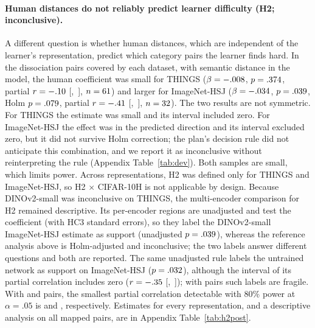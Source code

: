 \documentclass[11pt]{article}
\begin{document}
\paragraph{Human distances do not reliably predict learner difficulty (H2; inconclusive).} A different question is whether human distances, which are independent of the learner's representation, predict which category pairs the learner finds hard. In the dissociation pairs covered by each dataset, with semantic distance in the model, the human coefficient was small for THINGS ($\beta = -.008$, $p = .374$, partial $r = -.10$ [\HTwoThingsRLo,~\HTwoThingsRHi], $n = 61$) and larger for ImageNet-HSJ ($\beta = -.034$, $p = .039$, Holm $p = .079$, partial $r = -.41$ [\HTwoHsjRLo,~\HTwoHsjRHi], $n = 32$). The two results are not symmetric. For THINGS the estimate was small and its interval included zero. For ImageNet-HSJ the effect was in the predicted direction and its interval excluded zero, but it did not survive Holm correction; the plan's decision rule did not anticipate this combination, and we report it as inconclusive without reinterpreting the rule (Appendix Table~\ref{tab:dev}). Both samples are small, which limits power. Across representations, H2 was defined only for THINGS and ImageNet-HSJ, so H2 $\times$ CIFAR-10H is not applicable by design. Because DINOv2-small was inconclusive on THINGS, the multi-encoder comparison for H2 remained descriptive. Its per-encoder regions are unadjusted and test the coefficient (with HC3 standard errors), so they label the DINOv2-small ImageNet-HSJ estimate as support (unadjusted $p = .039$), whereas the reference analysis above is Holm-adjusted and inconclusive; the two labels answer different questions and both are reported. The same unadjusted rule labels the untrained network as support on ImageNet-HSJ ($p = .032$), although the interval of its partial correlation includes zero ($r = -.35$ [\VcHtwoRandHsjLo,~\VcHtwoRandHsjHi]); with \HTwoHsjN{} pairs such labels are fragile. With \HTwoThingsN{} and \HTwoHsjN{} pairs, the smallest partial correlation detectable with 80\% power at $\alpha = .05$ is \VcMdeThings{} and \VcMdeHsj, respectively. Estimates for every representation, and a descriptive analysis on all mapped pairs, are in Appendix Table~\ref{tab:h2post}.
\end{document}
